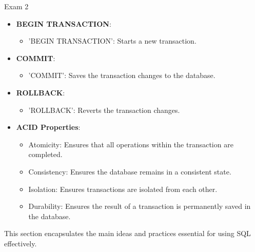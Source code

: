 \begin{examnotes}{Exam 2}
\begin{highlight}[Transactions]
        \begin{itemize}
            \item \textbf{BEGIN TRANSACTION}:
                \begin{itemize}
                    \item 'BEGIN TRANSACTION': Starts a new transaction.
                \end{itemize}
            \item \textbf{COMMIT}:
                \begin{itemize}
                    \item 'COMMIT': Saves the transaction changes to the database.
                \end{itemize}
            \item \textbf{ROLLBACK}:
                \begin{itemize}
                    \item 'ROLLBACK': Reverts the transaction changes.
                \end{itemize}
            \item \textbf{ACID Properties}:
                \begin{itemize}
                    \item Atomicity: Ensures that all operations within the transaction are completed.
                    \item Consistency: Ensures the database remains in a consistent state.
                    \item Isolation: Ensures transactions are isolated from each other.
                    \item Durability: Ensures the result of a transaction is permanently saved in the database.
                \end{itemize}
        \end{itemize}
    \end{highlight}
    
    \begin{highlight}
        This section encapsulates the main ideas and practices essential for using SQL effectively.
        

\end{highlight}
\end{examnotes}
